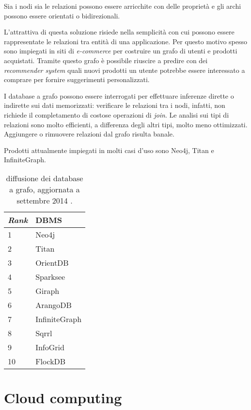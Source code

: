 Sia i nodi sia le relazioni possono essere arricchite con delle proprietà e gli archi possono essere orientati o bidirezionali.

L’attrattiva di questa soluzione risiede nella semplicità con cui possono essere rappresentate le relazioni tra entità di una applicazione. Per questo motivo spesso sono impiegati 
in siti di \textit{e-commerce} per costruire un grafo di utenti e prodotti acquistati. Tramite questo grafo è possibile riuscire a predire con dei \textit{recommender system} \cite{recsys} quali nuovi prodotti 
un utente potrebbe essere interessato a comprare per fornire suggerimenti personalizzati.

I database a grafo possono essere interrogati per effettuare inferenze dirette o indirette sui dati memorizzati: verificare le relazioni tra i nodi, infatti, non richiede il 
completamento di costose operazioni di \textit{join}. Le analisi sui tipi di relazioni sono molto efficienti, a differenza degli altri tipi, molto meno ottimizzati. Aggiungere o rimuovere 
relazioni dal grafo risulta banale.

Prodotti attualmente impiegati in molti casi d’uso sono Neo4j, Titan e InfiniteGraph.

\begin{table}[ht]
\centering
\begin{tabular}{|l|l|}
\hline
\textit{Rank} & DBMS          \\ \hline
1             & Neo4j         \\
2             & Titan         \\
3             & OrientDB      \\
4             & Sparksee      \\
5             & Giraph        \\
6             & ArangoDB      \\
7             & InfiniteGraph \\
8             & Sqrrl         \\
9             & InfoGrid      \\
10            & FlockDB       \\ \hline
\end{tabular}
\caption{diffusione dei database a grafo, aggiornata a settembre 2014 \cite{URL:dbengines}.}
\end{table}

\chapter{Cloud computing}
\label{chap:cloud}

